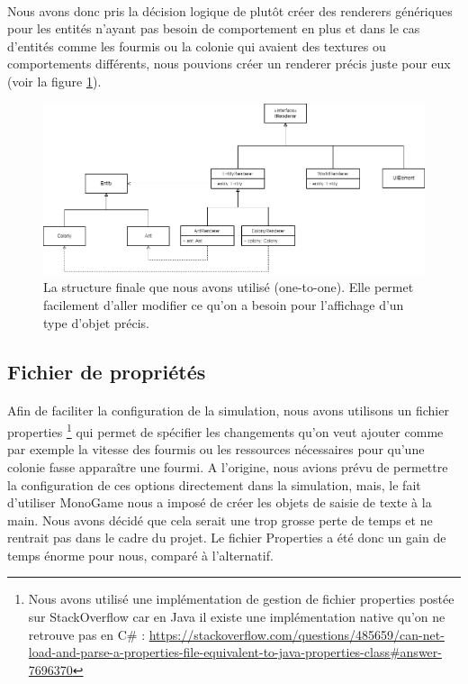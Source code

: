 \documentclass{EPUProjetDi}
\begin{document}
\paragraph{}
Nous avons donc pris la décision logique de plutôt créer des renderers génériques pour les entités n'ayant pas besoin de comportement 
en plus et dans le cas d'entités comme les fourmis ou la colonie qui avaient des textures ou comportements différents, nous pouvions créer un renderer
précis juste pour eux (voir la figure \ref{fig:renderer_logic_2}).

\begin{figure}[h]
    \centering
    \includegraphics[scale=0.5]{renderer_logic_2.png}
    \caption{La structure finale que nous avons utilisé (one-to-one). Elle permet facilement d'aller modifier ce qu'on a besoin pour l'affichage d'un type d'objet précis.}
    \label{fig:renderer_logic_2}
\end{figure}

\subsection{Fichier de propriétés}
\paragraph{}
Afin de faciliter la configuration de la simulation, nous avons utilisons un fichier properties
\footnote{Nous avons utilisé une implémentation de gestion de fichier properties postée sur StackOverflow car en Java il existe une implémentation native qu'on ne retrouve pas en C\# : 
\url{https://stackoverflow.com/questions/485659/can-net-load-and-parse-a-properties-file-equivalent-to-java-properties-class\#answer-7696370}}
qui permet de spécifier les changements qu'on veut ajouter comme par exemple la vitesse des fourmis
ou les ressources nécessaires pour qu'une colonie fasse apparaître une fourmi. A l'origine, nous avions prévu de permettre la configuration de ces options directement dans la simulation, mais,
le fait d'utiliser MonoGame nous a imposé de créer les objets de saisie de texte à la main. Nous avons décidé que cela serait une trop grosse perte de temps et ne rentrait pas dans 
le cadre du projet. Le fichier Properties a été donc un gain de temps énorme pour nous, comparé à l'alternatif.
\end{document}
